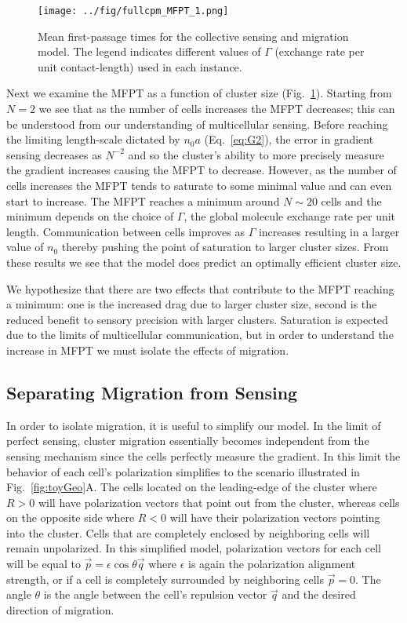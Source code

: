 \documentclass[phys,prelim]{puthesis}
\begin{document}
\begin{figure}[ht]
    \centering
        \texttt{[image: ../fig/fullcpm\_MFPT\_1.png]}
    \caption{Mean first-passage times for the collective sensing and migration model. The legend indicates different values of $\Gamma$ (exchange rate per unit contact-length) used in each instance.} \label{fig:fullMFPT}
\end{figure}

Next we examine the MFPT as a function of cluster size (Fig.\ \ref{fig:fullMFPT}). Starting from $N=2$ we see that as the number of cells increases the MFPT decreases; this can be understood from our understanding of multicellular sensing. Before reaching the limiting length-scale dictated by $n_0a$ (Eq.\ \ref{eq:G2}), the error in gradient sensing decreases as $N^{-2}$ and so the cluster's ability to more precisely measure the gradient increases causing the MFPT to decrease. However, as the number of cells increases the MFPT tends to saturate to some minimal value and can even start to increase. The MFPT reaches a minimum around $N \sim 20$ cells and the minimum depends on the choice of $\Gamma$, the global molecule exchange rate per unit length. Communication between cells improves as $\Gamma$ increases resulting in a larger value of $n_0$ thereby pushing the point of saturation to larger cluster sizes. From these results we see that the model does predict an optimally efficient cluster size.

We hypothesize that there are two effects that contribute to the MFPT reaching a minimum: one is the increased drag due to larger cluster size, second is the reduced benefit to sensory precision with larger clusters. Saturation is expected due to the limits of multicellular communication, but in order to understand the increase in MFPT we must isolate the effects of migration.

\subsection{Separating Migration from Sensing}

In order to isolate migration, it is useful to simplify our model. In the limit of perfect sensing, cluster migration essentially becomes independent from the sensing mechanism since the cells perfectly measure the gradient. In this limit the behavior of each cell's polarization simplifies to the scenario illustrated in Fig.\ \ref{fig:toyGeo}A. The cells located on the leading-edge of the cluster where $R>0$ will have polarization vectors that point out from the cluster, whereas cells on the opposite side where $R<0$ will have their polarization vectors pointing into the cluster. Cells that are completely enclosed by neighboring cells will remain unpolarized. In this simplified model, polarization vectors for each cell will be equal to $\vec{p} = \epsilon \cos\theta \vec{q}$ where $\epsilon$ is again the polarization alignment strength, or if a cell is completely surrounded by neighboring cells $\vec{p} = 0$. The angle $\theta$ is the angle between the cell's repulsion vector $\vec{q}$ and the desired direction of migration.
\end{document}

